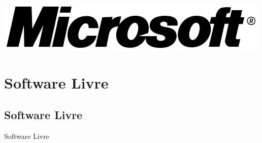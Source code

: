 \documentclass[xcolor=dvipsnames]{beamer}
\begin{document}
\begin{frame}
     \hspace{0.15cm}\includegraphics[scale=0.19]{microsoft.png}
\end{frame}




\section{Software Livre}
\subsection{Software Livre}

\begin{frame}
\vspace{0.2cm}
\begin{center}
\Huge{Software Livre}
\end{center}
\end{frame}
\end{document}
